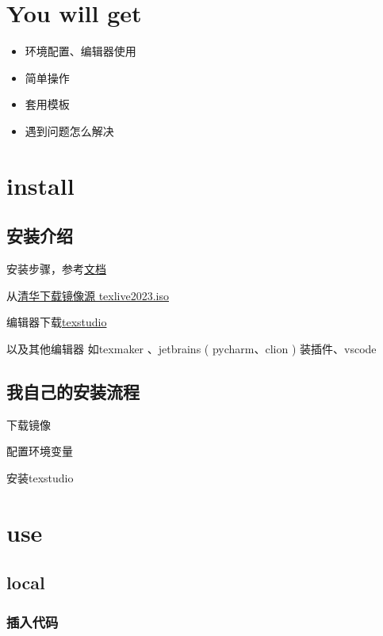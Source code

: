 \documentclass[11pt]{ctexart}
\begin{document}
	
\section{You will get}

\begin{itemize}
	\item 环境配置、编辑器使用
	\item 简单操作
	\item 套用模板
	\item  遇到问题怎么解决
\end{itemize}


\section{install}

\subsection{安装介绍}

安装步骤，参考\href{https://github.com/OsbertWang/install-latex-guide-zh-cn/releases}{文档}

从\href{https://mirrors.tuna.tsinghua.edu.cn/CTAN/systems/texlive/Images/}{清华下载镜像源 texlive2023.iso}

编辑器下载\href{https://www.texstudio.org/}{texstudio}

以及其他编辑器 如texmaker 、jetbrains ( pycharm、clion ) 装插件、vscode

\subsection{我自己的安装流程}

下载镜像

配置环境变量

安装texstudio

\section{use}

\subsection{local}

\subsubsection{ 插入代码}
\end{document}
